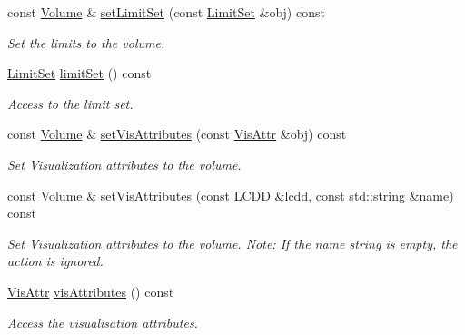 \begin{DoxyCompactItemize}
const \hyperlink{class_d_d4hep_1_1_geometry_1_1_volume}{Volume} \& \hyperlink{class_d_d4hep_1_1_geometry_1_1_volume_a9d569026c41f483a7f54a9a6947c96cd}{setLimitSet} (const \hyperlink{class_d_d4hep_1_1_geometry_1_1_limit_set}{LimitSet} \&obj) const 
\begin{DoxyCompactList}\small\item\em Set the limits to the volume. \item\end{DoxyCompactList}\item 
\hyperlink{class_d_d4hep_1_1_geometry_1_1_limit_set}{LimitSet} \hyperlink{class_d_d4hep_1_1_geometry_1_1_volume_aeadd5c51ef8dc4c601e191beea40edbc}{limitSet} () const 
\begin{DoxyCompactList}\small\item\em Access to the limit set. \item\end{DoxyCompactList}\item 
const \hyperlink{class_d_d4hep_1_1_geometry_1_1_volume}{Volume} \& \hyperlink{class_d_d4hep_1_1_geometry_1_1_volume_a5db10a2a883d77b2654fe1875d5d7bb5}{setVisAttributes} (const \hyperlink{class_d_d4hep_1_1_geometry_1_1_vis_attr}{VisAttr} \&obj) const 
\begin{DoxyCompactList}\small\item\em Set Visualization attributes to the volume. \item\end{DoxyCompactList}\item 
const \hyperlink{class_d_d4hep_1_1_geometry_1_1_volume}{Volume} \& \hyperlink{class_d_d4hep_1_1_geometry_1_1_volume_a2aa60c41207795302295e8147e2dc3d9}{setVisAttributes} (const \hyperlink{class_d_d4hep_1_1_geometry_1_1_l_c_d_d}{LCDD} \&lcdd, const std::string \&name) const 
\begin{DoxyCompactList}\small\item\em Set Visualization attributes to the volume. Note: If the name string is empty, the action is ignored. \item\end{DoxyCompactList}\item 
\hyperlink{class_d_d4hep_1_1_geometry_1_1_vis_attr}{VisAttr} \hyperlink{class_d_d4hep_1_1_geometry_1_1_volume_a53c50a053aebaff28bb27a36c824db50}{visAttributes} () const 
\begin{DoxyCompactList}\small\item\em Access the visualisation attributes. \item\end{DoxyCompactList}\item 

\end{DoxyCompactItemize}
